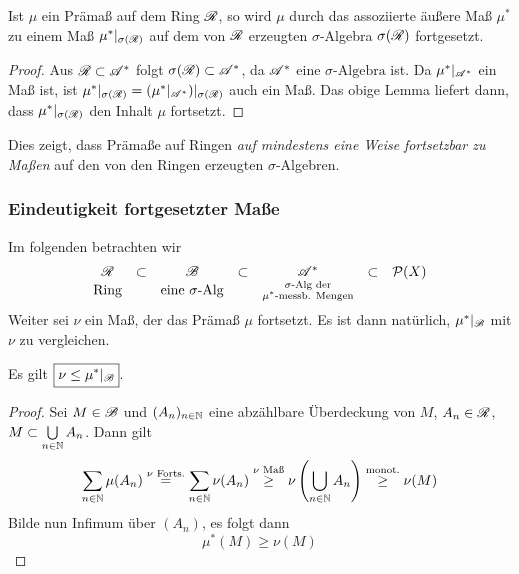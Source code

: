 \begin{satz}
\begin{mdframed}
Ist $\mu$ ein Prämaß auf dem Ring $\RR$, so wird $\mu$ durch das assoziierte äußere Maß $\mu^*$ zu einem Maß $\mu^*|_{\sigma(\RR)}$ auf dem von $\RR$ erzeugten $\sigma$-Algebra $\sigma(\RR)$ fortgesetzt.
\end{mdframed}
\begin{proof}
Aus $\RR \subset \AA^*$ folgt $\sigma(\RR)\subset \AA^*$, da $\AA^*$ eine $\sigma\text{-Algebra}$ ist. Da $\mu^*|_{\AA^*}$ ein Maß ist, ist $\mu^*|_{\sigma(\RR)} = (\mu^*|_{\AA^*})|_{\sigma(\RR)}$ auch ein Maß. Das obige Lemma liefert dann, dass $\mu^*|_{\sigma(\RR)}$ den Inhalt $\mu$ fortsetzt.
\end{proof}
\end{satz}
Dies zeigt, dass Prämaße auf Ringen \emph{auf mindestens eine Weise} \emph{fortsetzbar zu Maßen} auf den von den Ringen erzeugten $\sigma$-Algebren. 
\subsubsection{Eindeutigkeit fortgesetzter Maße}
Im folgenden betrachten wir
\begin{equation*}
\begin{array}{ccccccc}
\RR	&	 \subset		&	 \BB 		&	\subset		&	 \AA^* 	&	\subset		&	 \PP(X)\\
\text{Ring} & &\text{eine }\sigma\text{-Alg}	&& \substack{\sigma\text{-Alg der} \\ \mu^*\text{-messb. Mengen}}
\end{array}
\end{equation*}
Weiter sei $\nu$ ein Maß, der das Prämaß $\mu$ fortsetzt. Es ist dann natürlich, $\mu^*|_\BB$ mit $\nu$ zu vergleichen.

\begin{lemma}
Es gilt $\boxed{\nu \leq \mu^*|_\BB}$.
\begin{proof}
Sei $M\in \BB$ und $(A_n)_{n \in \N}$ eine abzählbare Überdeckung von $M$, $A_n \in \RR$, $M \subset \bigcup\limits_{n\in \N} A_n$. Dann gilt
$$
\sum_{n \in \N} \mu(A_n) \overset{\nu \text{ Forts.}}= \sum_{n \in \N} \nu(A_n) \overset{\nu \text{ Maß}}\geq \nu \left( \bigcup_{n \in \N} A_n \right)  \overset{\text{monot.}}\geq \nu (M)  
$$
Bilde nun Infimum über $(A_n)$, es folgt dann
$$
\mu^*(M) \geq \nu (M)
$$
\end{proof}
\end{lemma}

